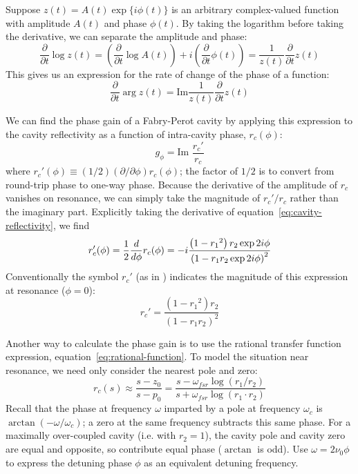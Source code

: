 Suppose $z(t)=A(t) \exp\{i \phi(t)\}$ is an arbitrary complex-valued
function with amplitude $A(t)$ and phase $\phi(t)$. By taking the
logarithm before taking the derivative, we can separate the amplitude
and phase:
%
\begin{equation}
\frac{\partial}{\partial t} \log z(t) = \left(\frac{\partial}{\partial t} \log A(t)\right) + i \left(\frac{\partial}{\partial t} \phi(t)\right)
= \frac{1}{z(t)} \frac{\partial}{\partial t} z(t)
\end{equation}
%
This gives us an expression for the rate of change of the phase of a function:
%
\begin{equation}
\frac{\partial}{\partial t} \arg z(t) = \text{Im} \frac{1}{z(t)} \frac{\partial}{\partial t} z(t)
\end{equation}

We can find the phase gain of a Fabry-Perot cavity by applying this expression to the cavity reflectivity as a function of intra-cavity phase, $r_c(\phi)$:
\begin{equation}
g_\phi = \text{Im\ } \frac{r_c'}{r_c}
\end{equation}
where $r_c'(\phi)\equiv(1/2)(\partial/\partial\phi)r_c(\phi)$; the factor of $1/2$ is to convert from round-trip phase to one-way phase.  Because the derivative of the amplitude of $r_c$ vanishes on resonance, we can simply take the magnitude of $r_c'/r_c$ rather than the imaginary part. Explicitly taking the derivative of equation~\ref{eq:cavity-reflectivity}, we find
\begin{equation}
r_c'(\phi) = \frac{1}{2}\frac{d}{d\phi} r_c(\phi) = 
-i \frac{\left(1-{r_1}^2\right) r_2 \exp 2 i \phi}
     {\left(1 - r_1 r_2 \exp 2 i \phi\right)^2}\\
\end{equation}
%
Conventionally the symbol $r_c'$ (as in \cite{LigoFreqResponse97}) indicates the magnitude of this expression at resonance ($\phi=0$):
\begin{equation}
r_c' = 
 \frac{\left(1-{r_1}^2\right) r_2 }
     {\left(1 - r_1 r_2 \right)^2}
\end{equation}

Another way to calculate the phase gain is to use the rational transfer function expression, equation~\ref{eq:rational-function}.  To model the situation near resonance, we need only consider the nearest pole and zero:
\[
r_c(s) \approx \frac{s - z_0}{s - p_0}
 = \frac{s - \omega_{fsr}\log \left(r_1 / r_2\right)}
        {s + \omega_{fsr}\log \left(r_1 \cdot r_2\right)}
\]
Recall that the phase at frequency $\omega$ imparted by a pole at
frequency $\omega_c$ is $\arctan\left(-\omega/\omega_c\right)$; a zero
at the same frequency subtracts this same phase.  For a maximally
over-coupled cavity (i.e. with $r_2 = 1$), the cavity pole and cavity
zero are equal and opposite, so contribute equal phase ($\arctan$ is
odd).  Use $\omega = 2\nu_0\phi$ to express the detuning phase $\phi$
as an equivalent detuning frequency.

